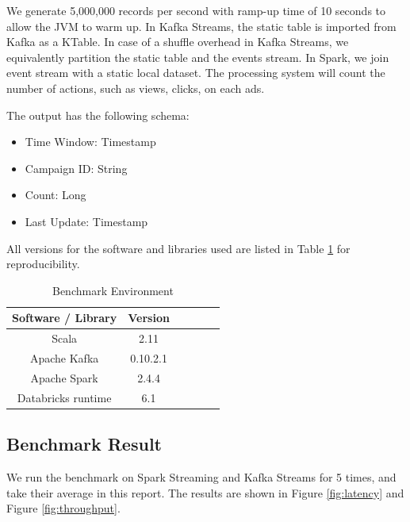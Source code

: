 \documentclass[pdftex,twocolumn,10pt,letterpaper]{article}
\begin{document}
We generate 5,000,000 records per second with ramp-up time of 10 seconds to allow the JVM to warm up. In Kafka Streams, the static table is imported from Kafka as a KTable. In case of a shuffle overhead in Kafka Streams, we equivalently partition the static table and the events stream. In Spark, we join event stream with a static local dataset. The processing system will count the number of actions, such as views, clicks, on each ads. 

The output has the following schema: 

\begin{itemize}
    \item Time Window: Timestamp
    \item Campaign ID: String
    \item Count: Long
    \item Last Update: Timestamp
\end{itemize}

All versions for the software and libraries used are listed in Table \ref{tab:setup} for reproducibility.

\begin{table}[]
    \centering
    \begin{tabular}{|c|c|c|c|c|c|}
         \hline
         Software / Library & Version \\
         \hline
         Scala & 2.11 \\ 
         \hline
         Apache Kafka & 0.10.2.1 \\ 
         \hline
         Apache Spark & 2.4.4 \\
         \hline
         Databricks runtime & 6.1 \\ 
         \hline
    \end{tabular}
    \caption{Benchmark Environment}
    \label{tab:setup}
\end{table}


\subsection{Benchmark Result}
We run the benchmark on Spark Streaming and Kafka Streams for 5 times, and take their average in this report. The results are shown in Figure \ref{fig:latency} and Figure \ref{fig:throughput}. 
\end{document}
